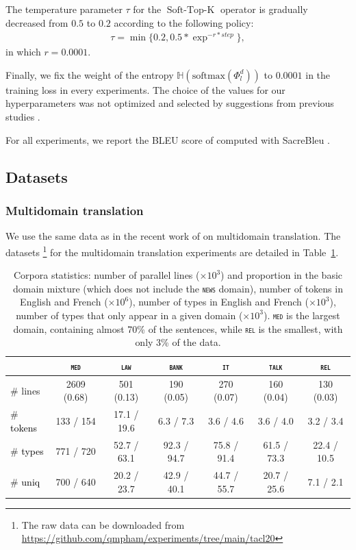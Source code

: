 \documentclass[11pt]{article}
\newcommand{\fyDone}[1]{\done[FY]\Todo[FY:]{\textcolor{orange}{#1}}}
\newcommand{\revisiondone}[1]{\textcolor{black}{#1}}
\newcommand{\domain}[1]{\texttt{\textsc{#1}}}
\begin{document}
The temperature parameter $\tau$ for the $\operatorname{Soft-Top-K}$ operator is gradually decreased from $0.5$ to $0.2$ according to the following policy:
\begin{align*}
\tau = \operatorname{min}\{ 0.2, 0.5 * \exp^{-r*step} \},
\end{align*}
in which $r=0.0001$.

Finally, we fix the weight of the entropy $\mathbb{H}(\text{softmax}(\Phi_l^d))$ to $0.0001$ in the training loss in every experiments. The choice of the values for our hyperparameters was not optimized and selected by suggestions from previous studies \citep{Jang17categorical,Gong21pay,Gong21adaptive}.

For all experiments, we report the BLEU score of \citet{Papineni02bleu} computed with SacreBleu \citep{Post18call}.\fyDone{Check this}

\subsection{Datasets}
\subsubsection{Multidomain translation}
We use the same data as in the recent work of \citet{Pham21revisiting} on multidomain translation.\fyDone{Add public to the data link} The datasets \footnote{The raw data can be downloaded from \url{https://github.com/qmpham/experiments/tree/main/tacl20}} for the multidomain translation experiments are detailed in Table~\ref{tab:Corpora-chap4}.
\begin{table}[h!]
  \centering
  \begin{tabular}{|l|cccccc|} %
    \cline{2-7} 
    \multicolumn{1}{c|}{} & \multicolumn{1}{c}{\domain{med}} & \multicolumn{1}{c}{\domain{law}} & \multicolumn{1}{c}{\domain{bank}} & \multicolumn{1}{c}{\domain{it}} & \multicolumn{1}{c}{\domain{talk}} & \multicolumn{1}{c}{\domain{rel}} \\
    \hline 
    \# lines & 2609 (0.68) & 501 (0.13) & 190 (0.05) & 270 (0.07) & 160 (0.04) & 130 (0.03) \\
    \# \revisiondone{tokens}  &  133 / 154  &  17.1 / 19.6 &  6.3 / 7.3 &  3.6 / 4.6 &  3.6 / 4.0 &  3.2 / 3.4 \\
    \# \revisiondone{types}  & 771 / 720 & 52.7 / 63.1 & 92.3 / 94.7 & 75.8 / 91.4 & 61.5 / 73.3 & 22.4 / 10.5 \\
    \# \revisiondone{uniq} & 700 / 640 & 20.2 / 23.7 & 42.9 / 40.1 & 44.7 / 55.7 & 20.7 / 25.6 & 7.1 / 2.1 \\
    \hline
  \end{tabular}
  \caption{Corpora statistics: number of parallel lines ($\times 10^3$) and proportion in the basic domain mixture (which does not include the \domain{news} domain), number of tokens in English and French ($\times 10^6$), number of types in English and French ($\times 10^3$), number of types that only appear in a given domain ($\times 10^3$). \domain{med} is the largest domain, containing almost 70\% of the sentences, while \domain{rel} is the smallest, with only 3\% of the data.
  }
\label{tab:Corpora-chap4}
\end{table}
\end{document}
